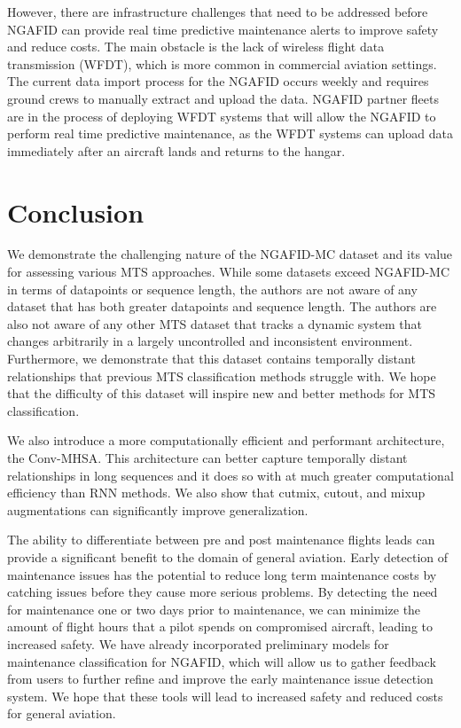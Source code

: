 \documentclass[letterpaper]{article} %
\begin{document}
However, there are infrastructure challenges that need to be addressed before NGAFID can provide real time predictive maintenance alerts to improve safety and reduce costs. The main obstacle is the lack of wireless flight data transmission (WFDT), which is more common in commercial aviation settings. The current data import process for the NGAFID occurs weekly and requires ground crews to manually extract and upload the data. NGAFID partner fleets are in the process of deploying WFDT systems that will allow the NGAFID to perform real time predictive maintenance, as the WFDT systems can upload data immediately after an aircraft lands and returns to the hangar. 



\section{Conclusion}

We demonstrate the challenging nature of the NGAFID-MC dataset and its value for assessing various MTS approaches. While some datasets exceed NGAFID-MC in terms of datapoints or sequence length, the authors are not aware of any dataset that has both greater datapoints and sequence length. The authors are also not aware of any other MTS dataset that tracks a dynamic system that changes arbitrarily in a largely uncontrolled and inconsistent environment. Furthermore, we demonstrate that this dataset contains temporally distant relationships that previous MTS classification methods struggle with. We hope that the difficulty of this dataset will inspire new and better methods for MTS classification. 

We also introduce a more computationally efficient and performant architecture, the Conv-MHSA. This architecture can better capture temporally distant relationships in long sequences and it does so with at much greater computational efficiency than RNN methods. We also show that cutmix, cutout, and mixup augmentations can significantly improve generalization.

The ability to differentiate between pre and post maintenance flights leads can provide a significant benefit to the domain of general aviation. Early detection of maintenance issues has the potential to reduce long term maintenance costs by catching issues before they cause more serious problems. By detecting the need for maintenance one or two days prior to maintenance, we can minimize the amount of flight hours that a pilot spends on compromised aircraft, leading to increased safety. We have already incorporated preliminary models for maintenance classification for NGAFID, which will allow us to gather feedback from users to further refine and improve the early maintenance issue detection system. We hope that these tools will lead to increased safety and reduced costs for general aviation.  



\end{document}
